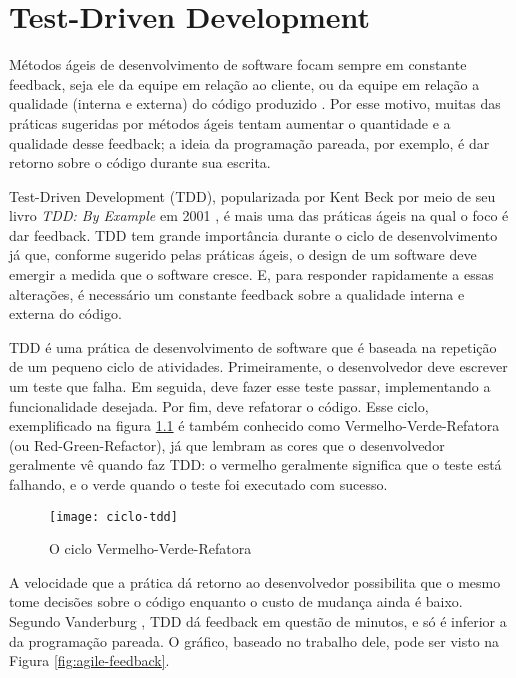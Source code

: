 \chapter{Test-Driven Development}
\label{cap:tdd}

Métodos ágeis de desenvolvimento de software focam sempre em constante
feedback, seja ele da equipe em relação ao cliente, ou da equipe em relação a
qualidade (interna e externa) do código produzido \cite{AgileManifesto}. Por
esse motivo, muitas das práticas sugeridas por métodos ágeis tentam aumentar o 
quantidade e a qualidade desse feedback; a ideia da programação pareada, por
exemplo, é dar retorno sobre o código durante sua escrita.

Test-Driven Development (TDD), popularizada por Kent Beck por meio de seu livro
\textit{TDD: By Example} em 2001 \cite{TDDByExample}, é mais uma das práticas
ágeis na qual o foco é dar feedback. TDD tem grande importância durante o ciclo
de desenvolvimento já que, conforme sugerido pelas práticas ágeis, o design de um
software deve emergir a medida que o software cresce. E, para responder
rapidamente a essas alterações, é necessário um constante feedback sobre a
qualidade interna e externa do código.

TDD é uma prática de desenvolvimento de software que é baseada na repetição de
um pequeno ciclo de atividades. Primeiramente, o desenvolvedor deve escrever um
teste que falha. Em seguida, deve fazer esse teste passar, implementando a
funcionalidade desejada. Por fim, deve refatorar o código. Esse ciclo,
exemplificado na figura \ref{fig:red-green-refactor} é também conhecido como 
Vermelho-Verde-Refatora (ou Red-Green-Refactor), já que lembram as cores que o 
desenvolvedor geralmente vê quando faz TDD: o vermelho geralmente significa que
o teste está falhando, e o verde quando o teste foi executado com sucesso.

\begin{figure}
  \centering
  \texttt{[image: ciclo-tdd]}
  \caption{O ciclo Vermelho-Verde-Refatora}
  \label{fig:red-green-refactor}
\end{figure}

A velocidade que a prática dá retorno ao desenvolvedor possibilita que o mesmo
tome decisões sobre o código enquanto o custo de mudança ainda é
baixo. Segundo Vanderburg \cite{vanderburg}, TDD dá feedback em questão de
minutos, e só é inferior a da programação pareada. O gráfico,
baseado no trabalho dele, pode ser visto na Figura
\ref{fig:agile-feedback}.

